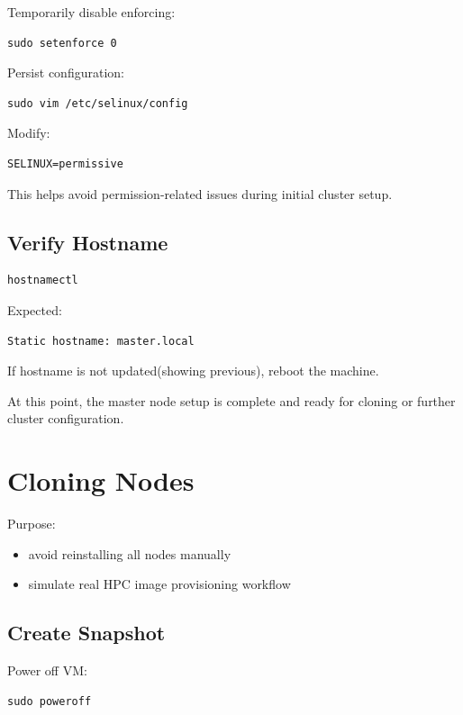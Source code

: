 \documentclass[11pt]{article}
\begin{document}
Temporarily disable enforcing:

\begin{verbatim}
sudo setenforce 0
\end{verbatim}

Persist configuration:

\begin{verbatim}
sudo vim /etc/selinux/config
\end{verbatim}

Modify:

\begin{verbatim}
SELINUX=permissive
\end{verbatim}
This helps avoid permission-related issues during initial cluster setup.
\subsection{Verify Hostname}
\label{sec:org132b6d6}

\begin{verbatim}
hostnamectl
\end{verbatim}

Expected:

\begin{verbatim}
Static hostname: master.local
\end{verbatim}

If hostname is not updated(showing previous), reboot the machine.

At this point, the master node setup is complete and ready for cloning or
further cluster configuration.
\section{Cloning Nodes}
\label{sec:orgf52af60}

Purpose:

\begin{itemize}
\item avoid reinstalling all nodes manually
\item simulate real HPC image provisioning workflow
\end{itemize}
\subsection{Create Snapshot}
\label{sec:org6c7fa9d}

Power off VM:

\begin{verbatim}
sudo poweroff
\end{verbatim}
\end{document}
